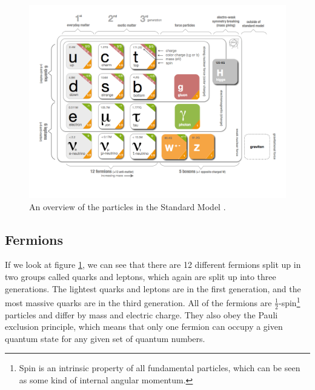 \begin{figure}[H]
    \centering
    \includegraphics[width=\textwidth]{Figures/FromOnline/SM.png}
    \caption{An overview of the particles in the Standard Model \cite{SMpicture}.}
    \label{fig:SM}
\end{figure}

\subsection{Fermions}
If we look at figure \ref{fig:SM}, we can see that there are 12 different fermions split up in two groups called quarks and leptons, which again are split up into three generations. The lightest quarks and leptons are in the first generation, and the most massive quarks are in the third generation. All of the fermions are $\frac{1}{2}$-spin\footnote{Spin is an intrinsic property of all fundamental particles, which can be seen as some kind of internal angular momentum.} particles and differ by mass and electric charge. They also obey the Pauli exclusion principle, which means that only one fermion can occupy a given quantum state for any given set of quantum numbers. 

